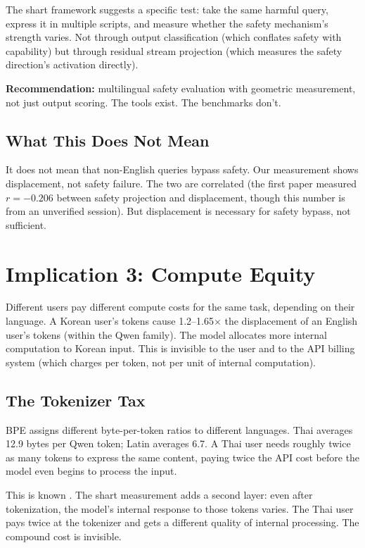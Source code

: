 \documentclass[11pt,a4paper]{article}
\begin{document}
The shart framework suggests a specific test: take the same harmful query, express it in multiple scripts, and measure whether the safety mechanism's strength varies. Not through output classification (which conflates safety with capability) but through residual stream projection (which measures the safety direction's activation directly).

\textbf{Recommendation:} multilingual safety evaluation with geometric measurement, not just output scoring. The tools exist. The benchmarks don't.

\subsection{What This Does Not Mean}

It does not mean that non-English queries bypass safety. Our measurement shows displacement, not safety failure. The two are correlated (the first paper measured $r = -0.206$ between safety projection and displacement, though this number is from an unverified session). But displacement is necessary for safety bypass, not sufficient.

\section{Implication 3: Compute Equity}

Different users pay different compute costs for the same task, depending on their language. A Korean user's tokens cause 1.2--1.65$\times$ the displacement of an English user's tokens (within the Qwen family). The model allocates more internal computation to Korean input. This is invisible to the user and to the API billing system (which charges per token, not per unit of internal computation).

\subsection{The Tokenizer Tax}

BPE assigns different byte-per-token ratios to different languages. Thai averages 12.9 bytes per Qwen token; Latin averages 6.7. A Thai user needs roughly twice as many tokens to express the same content, paying twice the API cost before the model even begins to process the input.

This is known \cite{petrov2023}. The shart measurement adds a second layer: even after tokenization, the model's internal response to those tokens varies. The Thai user pays twice at the tokenizer and gets a different quality of internal processing. The compound cost is invisible.
\end{document}
